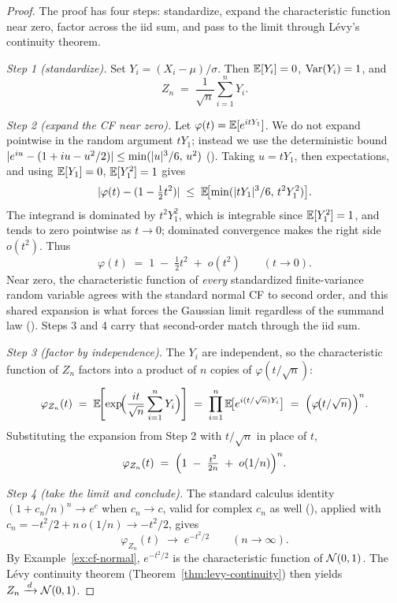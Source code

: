 \begin{proof}
The proof has four steps: standardize, expand the characteristic function near zero, factor across the iid sum, and pass to the limit through L\'evy's continuity theorem.

\smallskip
\noindent\emph{Step 1 (standardize).} Set \(Y_i = (X_i - \mu)/\sigma\). Then \(\mathbb{E}[Y_i] = 0\), \(\operatorname{Var}(Y_i) = 1\), and
\[
  Z_n \;=\; \frac{1}{\sqrt{n}} \sum_{i=1}^n Y_i.
\]

\smallskip
\noindent\emph{Step 2 (expand the CF near zero).} Let \(\varphi(t) = \mathbb{E}[e^{it Y_1}]\). We do not expand pointwise in the random argument \(t Y_1\); instead we use the deterministic bound \(\lvert e^{iu} - (1 + iu - u^2/2)\rvert \le \min(\lvert u\rvert^3/6,\, u^2)\) (\citealp[][Sec.~26]{Billingsley1995}). Taking \(u = t Y_1\), then expectations, and using \(\mathbb{E}[Y_1] = 0\), \(\mathbb{E}[Y_1^2] = 1\) gives
\[
  \lvert\varphi(t) - (1 - \tfrac{1}{2} t^2)\rvert \;\le\; \mathbb{E}\!\bigl[\min(\lvert t Y_1\rvert^3/6,\, t^2 Y_1^2)\bigr].
\]
The integrand is dominated by \(t^2 Y_1^2\), which is integrable since \(\mathbb{E}[Y_1^2] = 1\), and tends to zero pointwise as \(t \to 0\); dominated convergence makes the right side \(o(t^2)\). Thus
\[
  \varphi(t) \;=\; 1 \;-\; \tfrac{1}{2} t^2 \;+\; o(t^2) \qquad (t \to 0).
\]
Near zero, the characteristic function of \emph{every} standardized finite-variance random variable agrees with the standard normal CF to second order, and this shared expansion is what forces the Gaussian limit regardless of the summand law (\citealp[][Sec.~27]{Billingsley1995}). Steps 3 and 4 carry that second-order match through the iid sum.

\smallskip
\noindent\emph{Step 3 (factor by independence).} The \(Y_i\) are independent, so the characteristic function of \(Z_n\) factors into a product of \(n\) copies of \(\varphi(t/\sqrt{n})\):
\[
  \varphi_{Z_n}(t) \;=\; \mathbb{E}\!\Biggl[\exp\!\Bigl(\frac{i t}{\sqrt{n}} \sum_{i=1}^n Y_i\Bigr)\Biggr]
  \;=\; \prod_{i=1}^n \mathbb{E}\!\bigl[e^{i (t/\sqrt{n}) Y_i}\bigr]
  \;=\; \Bigl(\varphi\!\bigl(t/\sqrt{n}\bigr)\Bigr)^n.
\]
Substituting the expansion from Step 2 with \(t/\sqrt{n}\) in place of \(t\),
\[
  \varphi_{Z_n}(t) \;=\; \Bigl(1 \;-\; \tfrac{t^2}{2 n} \;+\; o(1/n)\Bigr)^n.
\]

\smallskip
\noindent\emph{Step 4 (take the limit and conclude).} The standard calculus identity \((1 + c_n/n)^n \to e^c\) when \(c_n \to c\), valid for complex \(c_n\) as well (\citealp[][Sec.~27]{Billingsley1995}), applied with \(c_n = -t^2/2 + n\,o(1/n) \to -t^2/2\), gives
\[
  \varphi_{Z_n}(t) \;\longrightarrow\; e^{-t^2/2} \qquad (n \to \infty).
\]
By Example~\ref{ex:cf-normal}, \(e^{-t^2/2}\) is the characteristic function of \(\mathcal{N}(0, 1)\). The L\'evy continuity theorem (Theorem~\ref{thm:levy-continuity}) then yields \(Z_n \xrightarrow{\,d\,} \mathcal{N}(0, 1)\).
\end{proof}

